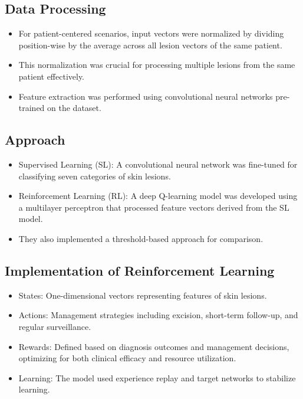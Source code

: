 \subsection*{Data Processing}
\begin{itemize}
    \item For patient-centered scenarios, input vectors were normalized by dividing position-wise by the average across all lesion vectors of the same patient.
    \item This normalization was crucial for processing multiple lesions from the same patient effectively.
    \item Feature extraction was performed using convolutional neural networks pre-trained on the dataset.
\end{itemize}

\subsection*{Approach}
\begin{itemize}
    \item Supervised Learning (SL): A convolutional neural network was fine-tuned for classifying seven categories of skin lesions.
    \item Reinforcement Learning (RL): A deep Q-learning model was developed using a multilayer perceptron that processed feature vectors derived from the SL model.
    \item They also implemented a threshold-based approach for comparison.
\end{itemize}

\subsection*{Implementation of Reinforcement Learning}
\begin{itemize}
    \item States: One-dimensional vectors representing features of skin lesions.
    \item Actions: Management strategies including excision, short-term follow-up, and regular surveillance.
    \item Rewards: Defined based on diagnosis outcomes and management decisions, optimizing for both clinical efficacy and resource utilization.
    \item Learning: The model used experience replay and target networks to stabilize learning.
\end{itemize}

